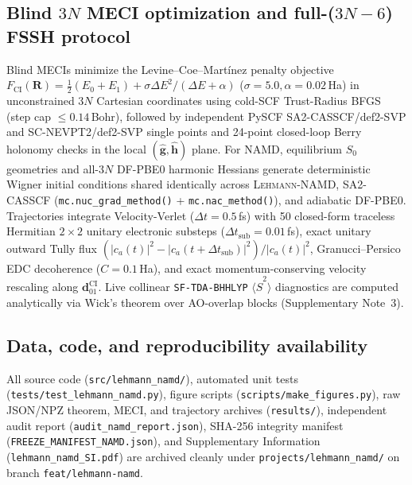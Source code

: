 \documentclass[10pt,twocolumn]{article}
\theoremstyle{natthm}
\newcommand{\leh}{\textsc{Lehmann-NAMD}}
\newcommand{\Ssq}{\langle\hat{S}^2\rangle}
\newcommand{\dCI}{\mathbf{d}_{01}^{\mathrm{CI}}}
\begin{document}
\subsection*{Blind $3N$ MECI optimization and full-($3N{-}6$) FSSH protocol}
Blind MECIs minimize the Levine--Coe--Mart\'inez penalty objective\cite{levine2008meci} $F_{\mathrm{CI}}(\mathbf{R})=\frac{1}{2}(E_0+E_1)+\sigma\Delta E^2/(\Delta E+\alpha)$ ($\sigma=5.0, \alpha=0.02$\,Ha) in unconstrained $3N$ Cartesian coordinates using cold-SCF Trust-Radius BFGS (step cap $\le 0.14$\,Bohr), followed by independent PySCF SA2-CASSCF/def2-SVP and SC-NEVPT2/def2-SVP single points and 24-point closed-loop Berry holonomy checks in the local $(\hat{\mathbf{g}},\hat{\mathbf{h}})$ plane.
For NAMD, equilibrium $S_0$ geometries and all-$3N$ DF-PBE0 harmonic Hessians generate deterministic Wigner initial conditions shared identically across \leh{}, SA2-CASSCF (\texttt{mc.nuc\_grad\_method()} + \texttt{mc.nac\_method()}), and adiabatic DF-PBE0.
Trajectories integrate Velocity-Verlet ($\Delta t=0.5$\,fs) with 50 closed-form traceless Hermitian $2\times 2$ unitary electronic substeps ($\Delta t_{\mathrm{sub}}=0.01$\,fs), exact unitary outward Tully flux $(|c_a(t)|^2-|c_a(t+\Delta t_{\mathrm{sub}})|^2)/|c_a(t)|^2$, Granucci--Persico EDC decoherence ($C=0.1$\,Ha)\cite{granucci2007edc}, and exact momentum-conserving velocity rescaling along $\dCI$.
Live collinear \texttt{SF-TDA-BHHLYP} $\Ssq$ diagnostics are computed analytically via Wick's theorem over AO-overlap blocks (Supplementary Note~3).

\subsection*{Data, code, and reproducibility availability}
All source code (\texttt{src/lehmann\_namd/}), automated unit tests (\texttt{tests/test\_lehmann\_namd.py}), figure scripts (\texttt{scripts/make\_figures.py}), raw JSON/NPZ theorem, MECI, and trajectory archives (\texttt{results/}), independent audit report (\texttt{audit\_namd\_report.json}), SHA-256 integrity manifest (\texttt{FREEZE\_MANIFEST\_NAMD.json}), and Supplementary Information (\texttt{lehmann\_namd\_SI.pdf}) are archived cleanly under \texttt{projects/lehmann\_namd/} on branch \texttt{feat/lehmann-namd}.

{\footnotesize
\setlength{\bibsep}{1.6pt plus 0.4pt}


}
\end{document}
